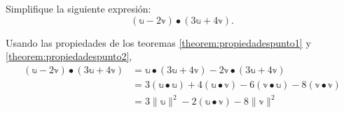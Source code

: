 \begin{examplebox}{}{}
    Simplifique la siguiente expresión:
    $$(\mathbb{u} - 2\mathbb{v}) \bullet (3\mathbb{u} + 4\mathbb{v}).$$

    \tcblower
    \solucion Usando las propiedades de los teoremas \ref{theorem:propiedadespunto1} y \ref{theorem:propiedadespunto2},
    \begin{align*}
        (\mathbb{u} - 2\mathbb{v}) \bullet (3\mathbb{u} + 4\mathbb{v}) & = \mathbb{u} \bullet (3\mathbb{u} + 4\mathbb{v}) - 2\mathbb{v} \bullet (3\mathbb{u} + 4\mathbb{v}) \\
        & = 3(\mathbb{u} \bullet \mathbb{u}) + 4(\mathbb{u} \bullet \mathbb{v}) - 6(\mathbb{v} \bullet \mathbb{u}) - 8(\mathbb{v} \bullet \mathbb{v}) \\
        & = 3\| \mathbb{u} \|^2 - 2(\mathbb{u} \bullet \mathbb{v}) - 8\| \mathbb{v} \|^2
    \end{align*}
\end{examplebox}

\newpage

